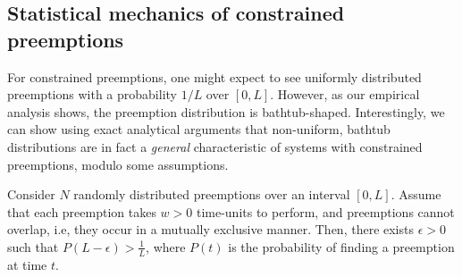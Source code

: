 
% 



\subsection{Statistical mechanics of constrained preemptions}
\label{subsec:stat-mech}

For constrained preemptions, one might expect to see uniformly distributed preemptions with a probability $1/L$ over $[0, L]$. 
However, as our empirical analysis shows, the preemption distribution is bathtub-shaped.
Interestingly, we can show using exact analytical arguments that non-uniform, bathtub distributions are in fact a \emph{general} characteristic of systems with constrained preemptions, modulo some assumptions. 

\begin{lemma}\label{lemma:1}
  Consider $N$ randomly distributed preemptions over an interval $[0, L]$.
  Assume that each preemption takes $w > 0$ time-units to perform, and preemptions cannot overlap, i.e, they occur in a mutually exclusive manner.
  Then, there exists $\epsilon > 0$ such that  $P(L-\epsilon) > \frac{1}{L}$, where 
 $P(t)$ is the probability of finding a preemption at time $t$. 
\end{lemma}


